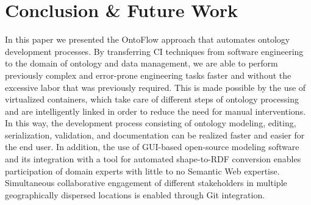 \documentclass[sigconf]{acmart}
\begin{document}
\noindent
{}

\section{Conclusion \& Future Work}
\label{sec:final}
In this paper we presented the OntoFlow approach that automates ontology development processes. By transferring CI techniques from software engineering to the domain of ontology and data management, we are able to perform previously complex and error-prone engineering tasks faster and without the excessive labor that was previously required. This is made possible by the use of virtualized containers, which take care of different steps of ontology processing and are intelligently linked in order to reduce the need for manual interventions. In this way, the development process consisting of ontology modeling, editing, serialization, validation, and documentation can be realized faster and easier for the end user. In addition, the use of GUI-based open-source modeling software and its integration with a tool for automated shape-to-RDF conversion enables participation of domain experts with little to no Semantic Web expertise. Simultaneous collaborative engagement of different stakeholders in multiple geographically dispersed locations is enabled through Git integration. 
\end{document}
